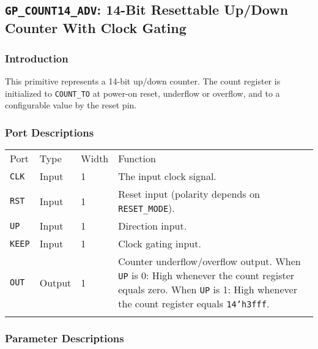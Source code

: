 \documentclass[11pt]{article}
\newcommand{\tokenstyle}[1]{\texttt{#1}}
\newcommand{\datastyle}[1]{\texttt{#1}}
\newcommand{\whenstyle}[1]{{\fontseries{sb}\selectfont#1}}
\newcommand{\thinhline}{\Xhline{1\arrayrulewidth}}
\newcommand{\thickhline}{\Xhline{2.5\arrayrulewidth}}
\begin{document}
\pagebreak
\subsection{\tokenstyle{GP\_COUNT14\_ADV}: 14-Bit Resettable Up/Down Counter With Clock Gating}
\label{gp-count14-adv}

\subsubsection{Introduction}
This primitive represents a 14-bit up/down counter. The count register is initialized to \tokenstyle{COUNT\_TO} at
power-on reset, underflow or overflow, and to a configurable value by the reset pin.

\subsubsection{Port Descriptions}

\begin{tabularx}{\textwidth}{lllX}
\thinhline
\whenstyle{Port} & \whenstyle{Type} & \whenstyle{Width} & \whenstyle{Function} \\
\thickhline
\tokenstyle{CLK} & Input & 1 & The input clock signal. \\
\thinhline
\tokenstyle{RST} & Input & 1 & Reset input (polarity depends on \tokenstyle{RESET\_MODE}). \\
\thinhline
\tokenstyle{UP} & Input & 1 & Direction input. \\
\thinhline
\tokenstyle{KEEP} & Input & 1 & Clock gating input. \\
\thinhline
\tokenstyle{OUT} & Output & 1 & Counter underflow/overflow output. \newline
	\whenstyle{When \tokenstyle{UP} is 0:} High whenever the count register equals zero. \newline
	\whenstyle{When \tokenstyle{UP} is 1:} High whenever the count register equals \datastyle{14'h3fff}. \\
\thinhline
\end{tabularx}

\subsubsection{Parameter Descriptions}
\end{document}
